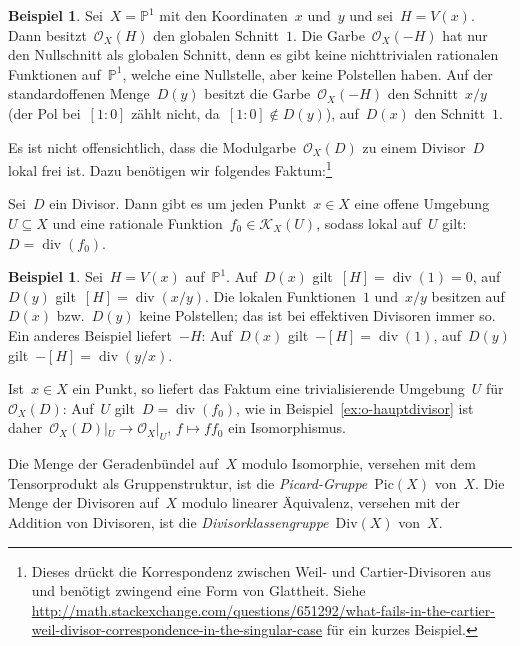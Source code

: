 \documentclass[a4paper,ngerman,12pt]{scrartcl}
\theoremstyle{definition}
\newtheorem{ex}[defn]{Beispiel}
\theoremstyle{plain}
\theoremstyle{remark}
\newcommand{\PP}{\mathbb{P}}
\newcommand{\K}{\mathcal{K}}
\renewcommand{\O}{\mathcal{O}}
\newcommand{\Pic}{\mathrm{Pic}}
\renewcommand{\div}{\operatorname{div}}
\newcommand{\Div}{\mathrm{Div}}
\begin{document}
\begin{ex}Sei~$X = \PP^1$ mit den Koordinaten~$x$ und~$y$ und sei~$H = V(x)$.
Dann besitzt~$\O_X(H)$ den globalen Schnitt~$1$. Die Garbe~$\O_X(-H)$ hat nur den
Nullschnitt als globalen Schnitt, denn es gibt keine nichttrivialen rationalen
Funktionen auf~$\PP^1$, welche eine Nullstelle, aber keine
Polstellen haben. Auf der standardoffenen Menge~$D(y)$ besitzt die Garbe~$\O_X(-H)$
den Schnitt~$x/y$ (der Pol bei~$[1:0]$ zählt nicht, da~$[1:0] \not\in D(y)$),
auf~$D(x)$ den Schnitt~$1$.
\end{ex}

Es ist nicht offensichtlich, dass die Modulgarbe~$\O_X(D)$ zu einem Divisor~$D$ lokal
frei ist. Dazu benötigen wir folgendes Faktum:\footnote{Dieses drückt die
Korrespondenz zwischen Weil- und Cartier-Divisoren aus und benötigt zwingend
eine Form von Glattheit. Siehe
\url{http://math.stackexchange.com/questions/651292/what-fails-in-the-cartier-weil-divisor-correspondence-in-the-singular-case}
für ein kurzes Beispiel.}

\begin{fact}Sei~$D$ ein Divisor. Dann gibt es um jeden Punkt~$x \in X$ eine
offene Umgebung~$U \subseteq X$ und eine rationale Funktion~$f_0 \in \K_X(U)$,
sodass lokal auf~$U$ gilt:~$D = \div(f_0)$.
\end{fact}

\begin{ex}Sei~$H = V(x)$ auf~$\PP^1$. Auf~$D(x)$ gilt~$[H] = \div(1) = 0$,
auf~$D(y)$ gilt~$[H] = \div(x/y)$. Die lokalen Funktionen~$1$ und~$x/y$
besitzen auf~$D(x)$ bzw.~$D(y)$ keine Polstellen; das ist bei effektiven
Divisoren immer so. Ein anderes Beispiel liefert~$-H$: Auf~$D(x)$ gilt~$-[H] =
\div(1)$, auf~$D(y)$ gilt~$-[H] = \div(y/x)$.\end{ex}

Ist~$x \in X$ ein Punkt, so liefert das Faktum eine trivialisierende
Umgebung~$U$ für~$\O_X(D)$: Auf~$U$ gilt~$D = \div(f_0)$, wie in
Beispiel~\ref{ex:o-hauptdivisor} ist daher~$\O_X(D)|_U \to \O_X|_U$, $f \mapsto
f f_0$ ein Isomorphismus.

\begin{defn}Die Menge der Geradenbündel
auf~$X$ modulo Isomorphie, versehen mit dem Tensorprodukt als Gruppenstruktur,
ist die \emph{Picard-Gruppe}~$\Pic(X)$ von~$X$. Die Menge der Divisoren auf~$X$
modulo linearer Äquivalenz, versehen mit der Addition von Divisoren, ist die
\emph{Divisorklassengruppe}~$\Div(X)$ von~$X$.
\end{defn}
\end{document}
